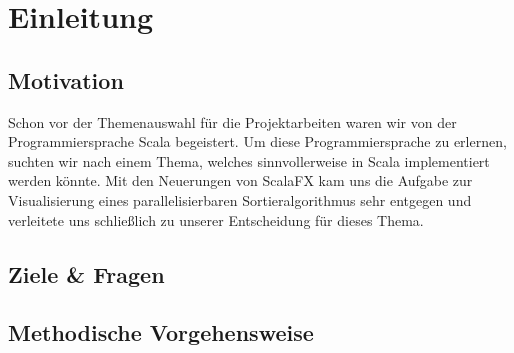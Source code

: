 \chapter{Einleitung}\label{chap:intro}
\section{Motivation}
Schon vor der Themenauswahl für die Projektarbeiten waren wir von der Programmiersprache Scala begeistert. Um diese Programmiersprache zu erlernen, suchten wir nach einem Thema, welches sinnvollerweise in Scala implementiert werden könnte. Mit den Neuerungen von ScalaFX kam uns die Aufgabe zur Visualisierung eines parallelisierbaren Sortieralgorithmus sehr entgegen und verleitete uns schließlich zu unserer Entscheidung für dieses Thema.
\section{Ziele \& Fragen}
\section{Methodische Vorgehensweise}
